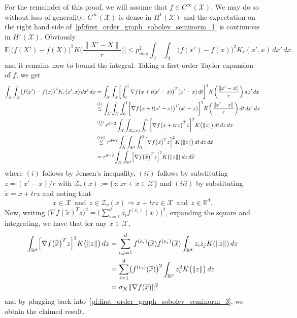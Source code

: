 \documentclass[twoside]{article}
\newcommand{\Reals}{\mathbb{R}}
\newcommand{\1}{\mathbf{1}}
\newcommand{\Rd}{\Reals^d}
\newcommand{\Xset}{\mathcal{X}}
\newcommand{\mc}[1]{\mathcal{#1}}
\newcommand{\Ebb}{\mathbb{E}}
\newcommand{\wt}[1]{\widetilde{#1}}
\theoremstyle{definition}
\theoremstyle{remark}
\begin{document}
For the remainder of this proof, we will assume that $f \in C^{\infty}(\Xset)$. We may do so without loss of generality: $C^{\infty}(\Xset)$ is dense in $H^1(\Xset)$ and the expectation on the right hand side of~\eqref{pf:first_order_graph_sobolev_seminorm_1} is continuous in $H^1(\Xset)$. Obviously
\begin{equation}
\Ebb\biggl[\bigl(f(X') - f(X)\bigr)^2K\biggl(\frac{\|X' - X\|}{r}\biggr)\biggr] \leq p_{\max}^2 \int_{\Xset} \int_{\Xset} \bigl(f(x') - f(x)\bigr)^2 K_r(x',x) \,dx' \,dx. \label{pf:first_order_graph_sobolev_seminorm_2}
\end{equation}
and it remains now to bound the integral. Taking a first-order Taylor expansion of $f$, we get
\begin{align}
\int_{\Xset} \int_{\Xset} \bigl(f(x') - f(x)\bigr)^2 K_r(x',x) \,dx' \,dx & = \int_{\Xset} \int_{\Xset} \biggl[\int_{0}^{1} \nabla f\bigl(x + t(x' - x)\bigr)^T (x' - x)\,dt\biggr]^2 K\biggl(\frac{\|x' - x\|}{r}\biggr) \,dx' \,dx \nonumber \\
& \overset{(i)}{\leq} \int_{\Xset} \int_{\Xset} \int_{0}^{1} \biggl[\nabla f\bigl(x + t(x' - x)\bigr)^T (x' - x)\biggr]^2 K\biggl(\frac{\|x' - x\|}{r}\biggr) \,dt\,dx' \,dx \nonumber \\
& \overset{(ii)}{=} r^{d + 2} \int_{\Xset} \int_{\mc{Z}_r(x)} \int_{0}^{1} \biggl[\nabla f\bigl(x + trz\bigr)^T z\biggr]^2 K\bigl(\|z\|\bigr) \,dt\,dz \,dx \\
&  \overset{(iii)}{\leq} r^{d + 2} \int_{\Xset} \int_{\Reals^d} \int_{0}^{1} \Bigl[\nabla f\bigl(\wt{x}\bigr)^T z\Bigr]^2 K\bigl(\|z\|\bigr) \,dt \,dz \,d\wt{x} \nonumber \\
& = r^{d + 2} \int_{\Xset} \int_{\Reals^d} \Bigl[\nabla f\bigl(\wt{x}\bigr)^T z\Bigr]^2 K\bigl(\|z\|\bigr) \,dz \,d\wt{x} \label{pf:first_order_graph_sobolev_seminorm_3}
\end{align}
where $(i)$ follows by Jensen's inequality, $(ii)$ follows by substituting $z = (x' - x)/r$ with $\mc{Z}_r(x) := \{z: zr + x \in \Xset\}$ and $(iii)$ by substituting $\wt{x} = x + trz$ and noting that
\begin{equation*}
x \in \Xset ~~\textrm{and}~~ z \in \mc{Z}_r(x) \Longrightarrow x + trz \in \Xset ~~\textrm{and}~~ z \in \Reals^d.
\end{equation*}
Now, writing $\bigl(\nabla f(\wt{x}) ^T z\bigr)^2 = \bigl(\sum_{i = 1}^{d} z_{i} f^{(e_i)}(x) \bigr)^2$, expanding the square and integrating, we have that for any $\wt{x} \in \Xset$,
\begin{align*}
\int_{\Reals^d} \Bigl[\nabla f\bigl(\wt{x}\bigr)^T z\Bigr]^2 K\bigl(\|z\|\bigr) \,dz & = \sum_{i,j = 1}^{d} f^{(e_i)}(\wt{x}) f^{(e_j)}(\wt{x}) \int_{\Rd} z_iz_jK(\|z\|) \,dz \\
& = \sum_{i = 1}^{d} \bigl(f^{(e_i)}(\wt{x})\bigr)^2 \int_{\Rd} z_i^2 K\bigl(\|z\|\bigr) \,dz \\
& = \sigma_K \|\nabla f(\wt{x})\|^2
\end{align*}
and by plugging back into~\eqref{pf:first_order_graph_sobolev_seminorm_3}, we obtain the claimed result. 
\end{document}
